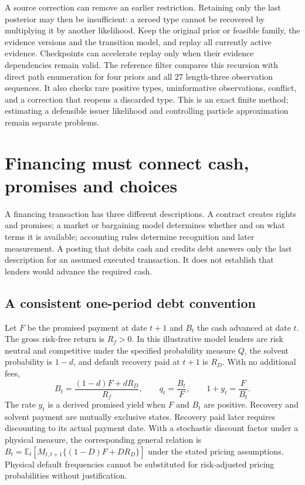 \documentclass[11pt,a4paper]{article}
\newcommand{\E}{\mathbb E}
\begin{document}
A source correction can remove an earlier restriction. Retaining only the
last posterior may then be insufficient: a zeroed type cannot be recovered
by multiplying it by another likelihood. Keep the original prior or feasible
family, the evidence versions and the transition model, and replay all
currently active evidence. Checkpoints can accelerate replay only when their
evidence dependencies remain valid. The reference filter compares this
recursion with direct path enumeration for four priors and all 27 length-three
observation sequences. It also checks rare positive types, uninformative
observations, conflict, and a correction that reopens a discarded type. This
is an exact finite method; estimating a defensible issuer likelihood and
controlling particle approximation remain separate problems.

\section{Financing must connect cash, promises and choices}
A financing transaction has three different descriptions. A contract creates
rights and promises; a market or bargaining model determines whether and on
what terms it is available; accounting rules determine recognition and later
measurement. A posting that debits cash and credits debt answers only the
last description for an assumed executed transaction. It does not establish
that lenders would advance the required cash.

\subsection{A consistent one-period debt convention}
Let $F$ be the promised payment at date $t+1$ and $B_t$ the cash advanced at
date $t$. The gross risk-free return is $R_f>0$. In this illustrative model
lenders are risk neutral and competitive under the specified probability
measure $Q$, the solvent probability is $1-d$, and default recovery paid at
$t+1$ is $R_D$. With no additional fees,
\begin{equation}\label{eq:debt}
B_t=\frac{(1-d)F+dR_D}{R_f},\qquad
q_t=\frac{B_t}{F},\qquad 1+y_t=\frac{F}{B_t}.
\end{equation}
The rate $y_t$ is a derived promised yield when $F$ and $B_t$ are positive.
Recovery and solvent payment are mutually exclusive states. Recovery paid
later requires discounting to its actual payment date. With a stochastic
discount factor under a physical measure, the corresponding general relation
is $B_t=\E_t[M_{t,t+1}\{(1-D)F+DR_D\}]$ under the stated pricing
assumptions. Physical default frequencies cannot be substituted for
risk-adjusted pricing probabilities without justification.
\end{document}
